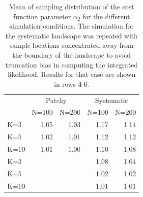 \documentclass[12pt]{article}
\begin{document}
\begin{spacing}{1.2}
\begin{table}
\centering
\caption{
Mean of sampling distribution of the cost function parameter
$\alpha_{2}$ for the different simulation
conditions.  The simulation for the systematic landscape was repeated
with sample locations concentrated away from the boundary of the
landscape to avoid truncation bias in computing the integrated
likelihood. Results for that case are shown in rows 4-6.
}
\begin{tabular}{l|rrrr}
 & \multicolumn{2}{c}{Patchy} & \multicolumn{2}{c}{Systematic} \\
    & N=100 &  N=200  &   N=100 &  N=200  \\ \hline
K=3 &   1.05&    1.03 &     1.17 & 1.14 \\
K=5 &   1.02&    1.01 &     1.12 &1.12 \\
K=10&   1.01&    1.00 &     1.10 &1.08 \\ \hline
K=3    &       &         &     1.08 & 1.04 \\
K=5    &       &         &     1.02 & 1.02 \\
K=10    &       &         &     1.01 & 1.01 \\
\end{tabular}
\label{tab.results2}
\end{table}






\newpage





\end{spacing}
\end{document}
